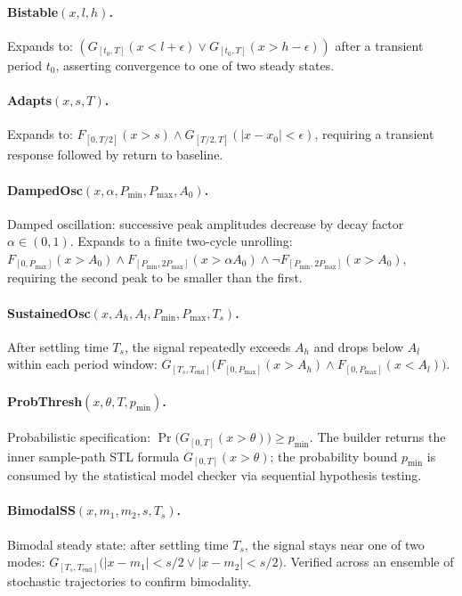 \documentclass[11pt]{article}
\begin{document}
\paragraph{Bistable$(x, l, h)$.}
Expands to: $(G_{[t_0,T]}(x < l + \epsilon) \lor G_{[t_0,T]}(x > h - \epsilon))$
after a transient period $t_0$, asserting convergence to one of two
steady states.

\paragraph{Adapts$(x, s, T)$.}
Expands to: $F_{[0,T/2]}(x > s) \land G_{[T/2,T]}(|x - x_0| < \epsilon)$,
requiring a transient response followed by return to baseline.

\paragraph{DampedOsc$(x, \alpha, P_{\min}, P_{\max}, A_0)$.}
Damped oscillation: successive peak amplitudes decrease by decay
factor $\alpha \in (0,1)$. Expands to a finite two-cycle unrolling:
$F_{[0, P_{\max}]}(x > A_0) \land
 F_{[P_{\min}, 2P_{\max}]}(x > \alpha A_0) \land
 \neg F_{[P_{\min}, 2P_{\max}]}(x > A_0)$,
requiring the second peak to be smaller than the first.

\paragraph{SustainedOsc$(x, A_h, A_l, P_{\min}, P_{\max}, T_s)$.}
After settling time $T_s$, the signal repeatedly exceeds $A_h$ and
drops below $A_l$ within each period window:
$G_{[T_s, T_{\text{end}}]}\big(F_{[0, P_{\max}]}(x > A_h) \land
 F_{[0, P_{\max}]}(x < A_l)\big)$.

\paragraph{ProbThresh$(x, \theta, T, p_{\min})$.}
Probabilistic specification: $\Pr\big(G_{[0,T]}(x > \theta)\big)
\geq p_{\min}$. The builder returns the inner sample-path STL
formula $G_{[0,T]}(x > \theta)$; the probability bound $p_{\min}$
is consumed by the statistical model checker via sequential
hypothesis testing.

\paragraph{BimodalSS$(x, m_1, m_2, s, T_s)$.}
Bimodal steady state: after settling time $T_s$, the signal stays
near one of two modes: $G_{[T_s, T_{\text{end}}]}\big(|x - m_1| <
s/2 \lor |x - m_2| < s/2\big)$. Verified across an ensemble of
stochastic trajectories to confirm bimodality.
\end{document}

